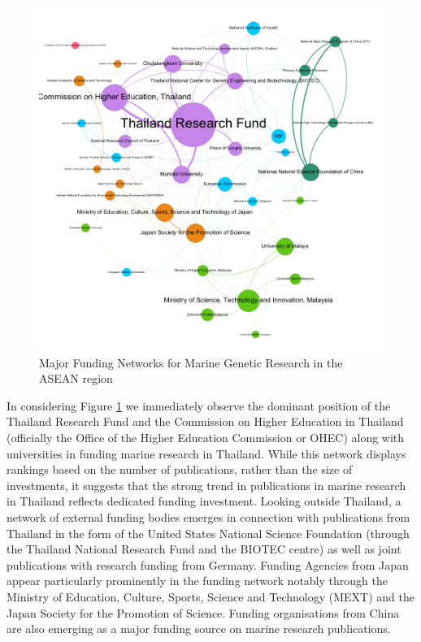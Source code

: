 \documentclass[]{book}
\theoremstyle{definition}
\theoremstyle{definition}
\theoremstyle{definition}
\theoremstyle{remark}
\begin{document}
\begin{figure}

{\centering \includegraphics[width=1\linewidth]{images/aseanmarinlit_fundingnetwork} 

}

\caption{Major Funding Networks for Marine Genetic Research in the ASEAN region}\label{fig:fundingnetwork}
\end{figure}

In considering Figure \ref{fig:fundingnetwork} we immediately observe
the dominant position of the Thailand Research Fund and the Commission
on Higher Education in Thailand (officially the Office of the Higher
Education Commission or OHEC) along with universities in funding marine
research in Thailand. While this network displays rankings based on the
number of publications, rather than the size of investments, it suggests
that the strong trend in publications in marine research in Thailand
reflects dedicated funding investment. Looking outside Thailand, a
network of external funding bodies emerges in connection with
publications from Thailand in the form of the United States National
Science Foundation (through the Thailand National Research Fund and the
BIOTEC centre) as well as joint publications with research funding from
Germany. Funding Agencies from Japan appear particularly prominently in
the funding network notably through the Ministry of Education, Culture,
Sports, Science and Technology (MEXT) and the Japan Society for the
Promotion of Science. Funding organisations from China are also emerging
as a major funding source on marine research publications.
\end{document}
